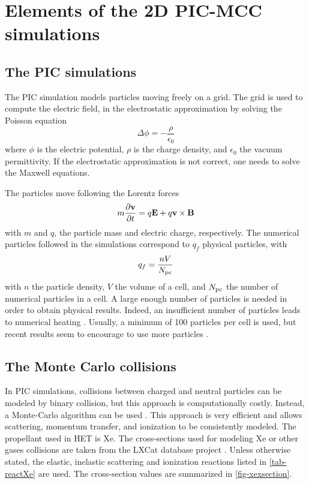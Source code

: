  

\section{Elements of the 2D PIC-MCC simulations}
  \label{sec-elements}
  \subsection{The PIC simulations}
    \label{subsec-intro}
    The \ac{PIC} simulation models particles moving freely on a grid.
    The grid is used to compute the electric field, in the electrostatic approximation by solving the Poisson equation
    \begin{equation}
      \label{eq-poisson}
      \Delta \phi = - \frac{\rho}{\epsilon_0}
    \end{equation}
    where $\phi$ is the electric potential, $\rho$ is the charge density, and $\epsilon_0$ the vacuum permittivity.
    If the electrostatic approximation is not correct, one needs to solve the Maxwell equations.

    The particles move following the Lorentz forces
    \begin{equation}
      \label{eq-Lor}
      m \frac{\partial {\bf v}}{\partial t} = q {\mathbf E} + q {\bf v} \times {\bf B}
    \end{equation}
    with $m$ and $q$, the particle mass and electric charge, respectively.
    The numerical particles followed in the simulations correspond to $q_f$ physical particles, with
    \begin{equation}
      q_f = \frac{n V}{N_{\rm pc}}
    \end{equation}
    with $n$ the particle density, $V$ the volume of a cell, and $N_{\rm pc}$ the number of numerical particles in a cell.
    A large enough number of particles is needed in order to obtain physical results.
    Indeed, an insufficient number of particles leads to numerical heating \cite{ueda1994}.
    Usually, a minimum of 100 particles per cell is used, but recent results seem to encourage to use more particles \cite{janhunen2018}.

  \subsection{The Monte Carlo collisions}

    In \ac{PIC} simulations, collisions between charged and neutral particles can be modeled by binary collision, but this approach is computationally costly.
    Instead, a Monte-Carlo algorithm can be used \cite{vahedi1995}.
    This approach is very efficient and allows scattering, momentum transfer, and ionization to be consistently modeled.
    The propellant used in \ac{HET} is \ac{Xe}.
    The cross-sections used for modeling \ac{Xe} or other gases collisions are taken from the {\sc LXCat} database project \cite{LXCat_web,pancheshnyi2012}.
    Unless otherwise stated, the elastic, inelastic scattering and ionization reactions listed in \cref{tab-reactXe} are used.
    The cross-section values are summarized in \cref{fig-xexsection}.

